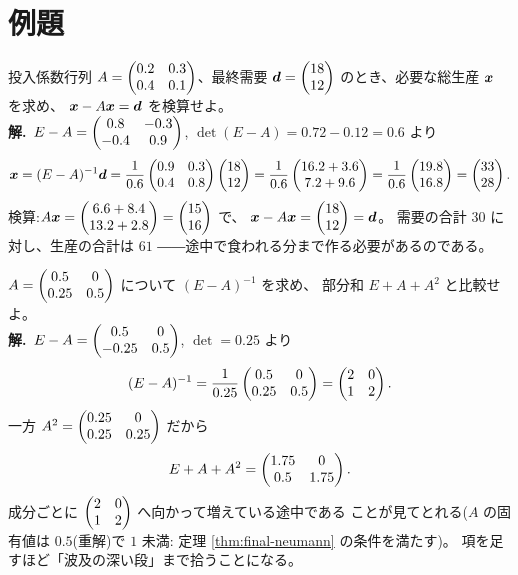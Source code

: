 \section{例題}

\begin{rei}[例題・基本(レオンチェフモデル)]\label{rei:final-basic1}
投入係数行列 $A = \begin{pmatrix}0.2 & 0.3 \\ 0.4 & 0.1\end{pmatrix}$、最終需要
$\bm{d} = \begin{pmatrix}18 \\ 12\end{pmatrix}$ のとき、必要な総生産 $\bm{x}$ を求め、
$\bm{x} - A\bm{x} = \bm{d}$ を検算せよ。\\
\textbf{解.}\ $E - A = \begin{pmatrix}0.8 & -0.3 \\ -0.4 & 0.9\end{pmatrix}$,
$\det(E - A) = 0.72 - 0.12 = 0.6$ より
\[
\bm{x} = (E - A)^{-1}\bm{d}
= \frac{1}{0.6}\begin{pmatrix}0.9 & 0.3 \\ 0.4 & 0.8\end{pmatrix}\begin{pmatrix}18 \\ 12\end{pmatrix}
= \frac{1}{0.6}\begin{pmatrix}16.2 + 3.6 \\ 7.2 + 9.6\end{pmatrix}
= \frac{1}{0.6}\begin{pmatrix}19.8 \\ 16.8\end{pmatrix} = \begin{pmatrix}33 \\ 28\end{pmatrix}.
\]
検算:$A\bm{x} = \begin{pmatrix}6.6 + 8.4 \\ 13.2 + 2.8\end{pmatrix} = \begin{pmatrix}15 \\ 16\end{pmatrix}$ で、
$\bm{x} - A\bm{x} = \begin{pmatrix}18 \\ 12\end{pmatrix} = \bm{d}$。
需要の合計 $30$ に対し、生産の合計は $61$
――途中で食われる分まで作る必要があるのである。
\end{rei}

\begin{rei}[例題・基本(ノイマン級数の体感)]\label{rei:final-basic2}
$A = \begin{pmatrix}0.5 & 0 \\ 0.25 & 0.5\end{pmatrix}$ について $(E - A)^{-1}$ を求め、
部分和 $E + A + A^2$ と比較せよ。\\
\textbf{解.}\ $E - A = \begin{pmatrix}0.5 & 0 \\ -0.25 & 0.5\end{pmatrix}$,
$\det = 0.25$ より
\[
(E - A)^{-1} = \frac{1}{0.25}\begin{pmatrix}0.5 & 0 \\ 0.25 & 0.5\end{pmatrix}
= \begin{pmatrix}2 & 0 \\ 1 & 2\end{pmatrix}.
\]
一方 $A^2 = \begin{pmatrix}0.25 & 0 \\ 0.25 & 0.25\end{pmatrix}$ だから
\[
E + A + A^2 = \begin{pmatrix}1.75 & 0 \\ 0.5 & 1.75\end{pmatrix}.
\]
成分ごとに $\begin{pmatrix}2 & 0 \\ 1 & 2\end{pmatrix}$ へ向かって増えている途中である
ことが見てとれる($A$ の固有値は $0.5$(重解)で $1$ 未満:
定理 \ref{thm:final-neumann} の条件を満たす)。
項を足すほど「波及の深い段」まで拾うことになる。
\end{rei}

